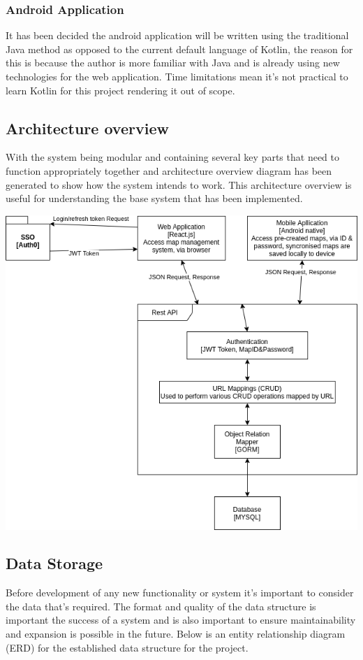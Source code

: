 \subsubsection{Android Application}
It has been decided the android application will be written using the traditional Java method as opposed to the current default language of Kotlin, the reason for this is because the author is more familiar with Java and is already using new technologies for the web application. Time limitations mean it's not practical to learn Kotlin for this project rendering it out of scope.

\subsection{Architecture overview}
With the system being modular and containing several key parts that need to function appropriately together and architecture overview diagram has been generated to show how the system intends to work. This architecture overview is useful for understanding the base system that has been implemented.

\includegraphics[width=\linewidth]{./images/designs/ArchitectureOverview.png}

\subsection{Data Storage}
Before development of any new functionality or system it's important to consider the data that's required. The format and quality of the data structure is important the success of a system and is also important to ensure maintainability and expansion is possible in the future. Below is an entity relationship diagram (ERD) for the established data structure for the project.

